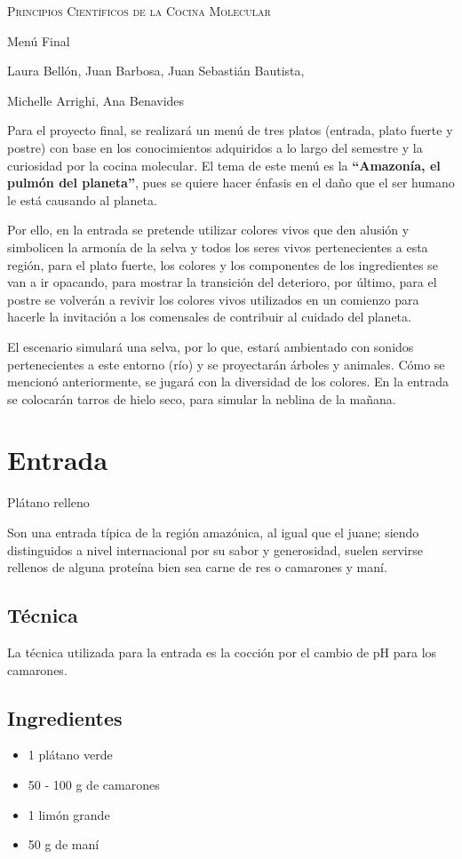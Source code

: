 \documentclass{scrartcl}
\newcommand{\msection}[2]{\section{#1}{\color{Maroon}\fontspec{Zapfino.ttf}\begin{center}#2\end{center}}}
\begin{document}
 
	\pagecolor{fondpaille}
	\begin{center}
		\scshape
		\color{Maroon}            
		Principios Científicos de la Cocina Molecular
			
		\huge
		Menú Final
		
		\vspace{1cm}
		\footnotesize
		Laura Bellón, Juan Barbosa, Juan Sebastián Bautista,
		
		Michelle Arrighi, Ana Benavides
	\end{center}
	
	\Large
	
	Para el proyecto final, se realizará un menú de tres platos (entrada, plato fuerte y postre) con base en los conocimientos adquiridos a lo largo del semestre y la curiosidad por la cocina molecular. El tema de este menú es la \textbf{“Amazonía, el pulmón del planeta”}, pues se quiere hacer énfasis en el daño que el ser humano le está causando al planeta.  
	
	Por ello, en la entrada se pretende utilizar colores vivos que den alusión y simbolicen la armonía de la selva y todos los seres vivos pertenecientes a esta región, para el plato fuerte, los colores y los componentes de los ingredientes se van a ir opacando, para mostrar la transición del deterioro, por último, para el postre se volverán a revivir los colores vivos utilizados en un comienzo para hacerle la invitación a los comensales de contribuir al cuidado del planeta.  
	
	El escenario simulará una selva, por lo que, estará ambientado con sonidos pertenecientes a este entorno (río) y se proyectarán árboles y animales. Cómo se mencionó anteriormente, se jugará con la diversidad de los colores. En la entrada se colocarán tarros de hielo seco, para simular la neblina de la mañana.
	
	\newpage
	\tableofcontents
	
	\newpage
	\msection{Entrada}{Plátano relleno}
	Son una entrada típica de la región amazónica, al igual que el juane; siendo distinguidos a nivel internacional por su sabor y generosidad, suelen servirse rellenos de alguna proteína bien sea carne de res o camarones y maní. \cite{travel, tipicos}
	\subsection{T\'ecnica}
	La técnica utilizada para la entrada es la cocción por el cambio de pH para los camarones. 
	\subsection{Ingredientes}
	\begin{multicols}{2}
		\begin{itemize}
			\item 1 pl\'atano verde
			\item 50 - 100 g de camarones
			\item 1 lim\'on grande
			\item 50 g de man\'i
		\end{itemize}
	\end{multicols}
\end{document}
